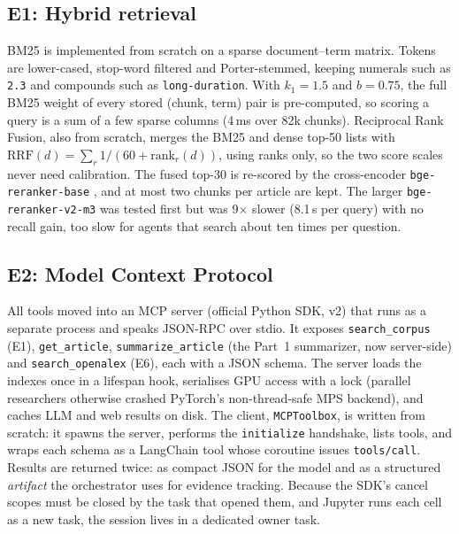 \subsection{E1: Hybrid retrieval}
BM25 is implemented from scratch on a sparse document--term matrix. Tokens are lower-cased, stop-word
filtered and Porter-stemmed, keeping numerals such as \texttt{2.3} and compounds such as
\texttt{long-duration}. With $k_1{=}1.5$ and $b{=}0.75$, the full BM25 weight of every stored
(chunk, term) pair is pre-computed, so scoring a query is a sum of a few sparse columns (4\,ms over 82k
chunks). Reciprocal Rank Fusion, also from scratch, merges the BM25 and dense top-50 lists with
$\mathrm{RRF}(d)=\sum_r 1/(60+\mathrm{rank}_r(d))$, using ranks only, so the two score scales never
need calibration. The fused top-30 is re-scored by the cross-encoder \texttt{bge-reranker-base}
\cite{nogueira2019passage}, and at most two chunks per article are kept. The larger
\texttt{bge-reranker-v2-m3} was tested first but was 9$\times$ slower (8.1\,s per query) with no recall
gain, too slow for agents that search about ten times per question.

\subsection{E2: Model Context Protocol}
All tools moved into an MCP server (official Python SDK, v2) that runs as a separate process and speaks
JSON-RPC over stdio. It exposes \texttt{search\_corpus} (E1), \texttt{get\_article},
\texttt{summarize\_article} (the Part~1 summarizer, now server-side) and \texttt{search\_openalex} (E6),
each with a JSON schema. The server loads the indexes once in a lifespan hook, serialises GPU access with a
lock (parallel researchers otherwise crashed PyTorch's non-thread-safe MPS backend), and caches LLM and
web results on disk. The client, \texttt{MCPToolbox}, is written from scratch: it spawns the server,
performs the \texttt{initialize} handshake, lists tools, and wraps each schema as a LangChain tool whose
coroutine issues \texttt{tools/call}. Results are returned twice: as compact JSON for the model and as a
structured \emph{artifact} the orchestrator uses for evidence tracking. Because the SDK's cancel scopes must
be closed by the task that opened them, and Jupyter runs each cell as a new task, the session lives in a
dedicated owner task.

